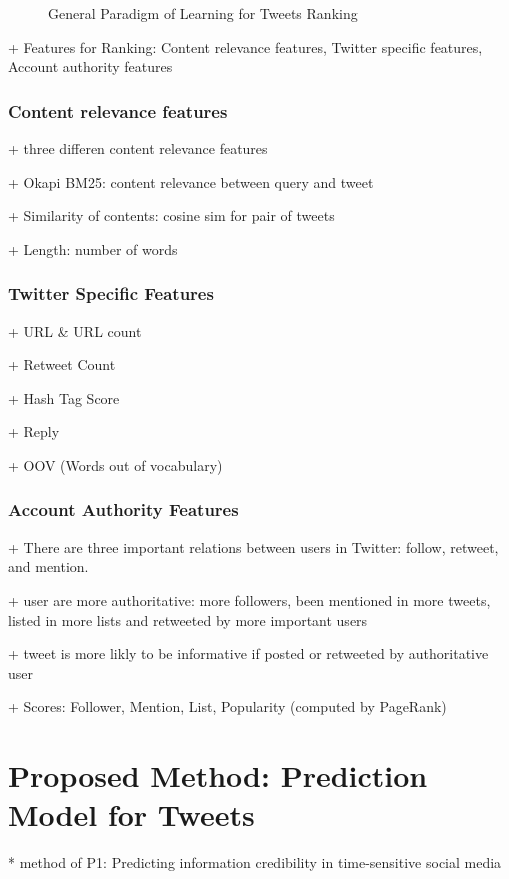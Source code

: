 \documentclass{proseminar}
\begin{document}
\begin{figure}[h]
\centering
{}
\caption{General Paradigm of Learning for Tweets Ranking}
\end{figure}

+ Features for Ranking: Content relevance features, Twitter specific features, Account authority features

\subsubsection*{Content relevance features}

+ three differen content relevance features

+ Okapi BM25: content relevance between query and tweet

+ Similarity  of  contents: cosine sim for pair of tweets

+ Length: number of words

\subsubsection*{Twitter Specific Features}
+ URL \& URL count

+ Retweet Count

+ Hash Tag Score

+ Reply

+ OOV (Words out of vocabulary)

\subsubsection*{Account Authority Features}
+ There are three important relations between users in Twitter: follow, retweet, and mention. 

+ user are more authoritative: more followers, been mentioned in more tweets, listed in more lists and retweeted by more important users

+ tweet is more likly to be informative if posted or retweeted by authoritative user

+ Scores: Follower, Mention, List, Popularity (computed by PageRank)


\section{Proposed Method: Prediction\\ Model for Tweets}
* method of P1: Predicting information credibility in time-sensitive social media
\end{document}
